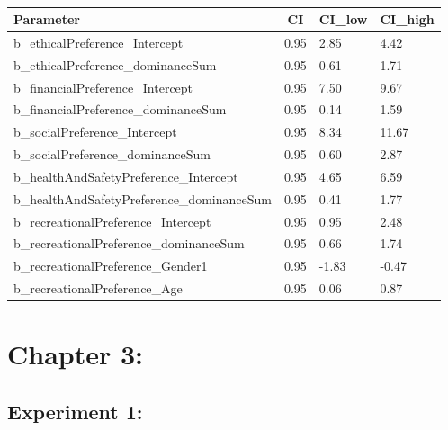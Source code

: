 \documentclass[
  donotrepeattitle,doc, 12pt, a4paper,floatsintext]{apa7}
\begin{document}
\begin{table}[tbp]

\begin{center}
\begin{threeparttable}

\caption{\label{tab:unnamed-chunk-13}}

\begin{tabular}{llll}
\toprule
Parameter & \multicolumn{1}{c}{CI} & \multicolumn{1}{c}{CI\_low} & \multicolumn{1}{c}{CI\_high}\\
\midrule
b\_ethicalPreference\_Intercept & 0.95 & 2.85 & 4.42\\
b\_ethicalPreference\_dominanceSum & 0.95 & 0.61 & 1.71\\
b\_financialPreference\_Intercept & 0.95 & 7.50 & 9.67\\
b\_financialPreference\_dominanceSum & 0.95 & 0.14 & 1.59\\
b\_socialPreference\_Intercept & 0.95 & 8.34 & 11.67\\
b\_socialPreference\_dominanceSum & 0.95 & 0.60 & 2.87\\
b\_healthAndSafetyPreference\_Intercept & 0.95 & 4.65 & 6.59\\
b\_healthAndSafetyPreference\_dominanceSum & 0.95 & 0.41 & 1.77\\
b\_recreationalPreference\_Intercept & 0.95 & 0.95 & 2.48\\
b\_recreationalPreference\_dominanceSum & 0.95 & 0.66 & 1.74\\
b\_recreationalPreference\_Gender1 & 0.95 & -1.83 & -0.47\\
b\_recreationalPreference\_Age & 0.95 & 0.06 & 0.87\\
\bottomrule
\end{tabular}

\end{threeparttable}
\end{center}

\end{table}

\hypertarget{chapter-3}{%
\section{Chapter 3:}\label{chapter-3}}

\hypertarget{experiment-1}{%
\subsection{Experiment 1:}\label{experiment-1}}
\end{document}
